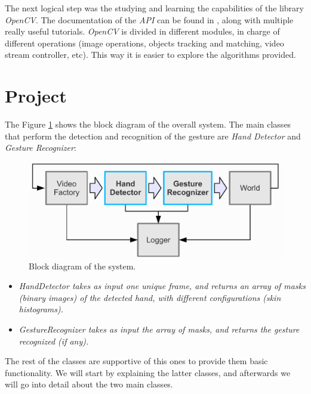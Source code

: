 \documentclass[11pt,a4paper]{article}
\begin{document}
The next logical step was the studying and learning the capabilities of the library \textit{OpenCV}. The documentation of the \textit{API} can be found in \cite{OpenCVdoc2013}, along with multiple really useful tutorials. \textit{OpenCV} is divided in different modules, in charge of different operations (image operations, objects tracking and matching, video stream controller, etc). This way it is easier to explore the algorithms provided.\\


\section{Project}
The Figure \ref{general_scheme} shows the block diagram of the overall system. The main classes that perform the detection and recognition of the gesture are \textit{Hand Detector} and \textit{Gesture Recognizer}:\\

\begin{figure}[tbh]
\centering
\includegraphics[width=13cm]{images/general_scheme}
\caption{Block diagram of the system.}
\label{general_scheme}
\end{figure}


\begin{itemize}
\item \textit{HandDetector takes as input one unique frame, and returns an array of masks (binary images) of the detected hand, with different configurations (skin histograms).}
\item \textit{GestureRecognizer takes as input the array of masks, and returns the gesture recognized (if any).\\ }
\end{itemize}

The rest of the classes are supportive of this ones to provide them basic functionality. We will start by explaining the latter classes, and afterwards we will go into detail about the two main classes.
\end{document}
